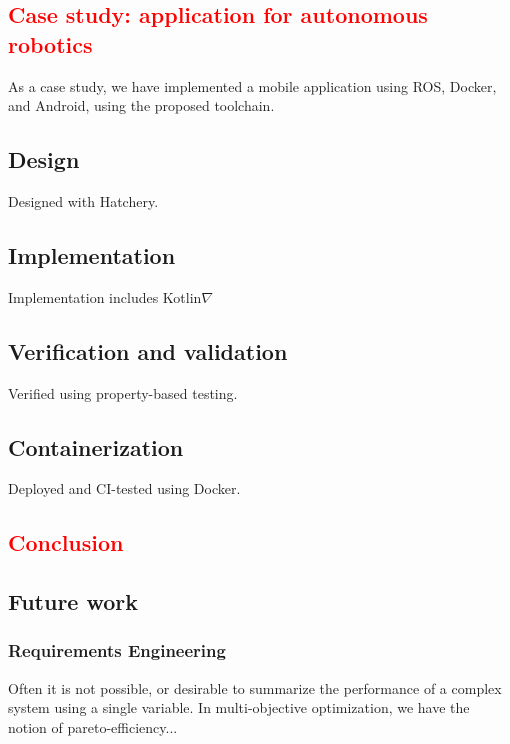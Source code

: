 \documentclass[12pt,initial,twoside,maitrise]{dms}
\newcommand{\rare}[1]{\textcolor{red}{#1}}
\numberwithin{equation}{section}
\numberwithin{table}{chapter}
\numberwithin{figure}{chapter}
\begin{document}
\rare{\chapter{Case study: application for autonomous robotics}\label{ch:case-study}}

As a case study, we have implemented a mobile application using ROS, Docker, and Android, using the proposed toolchain.

\section{Design}

Designed with Hatchery.

\section{Implementation}

Implementation includes Kotlin$\nabla$

\section{Verification and validation}

Verified using property-based testing.

\section{Containerization}

Deployed and CI-tested using Docker.

\rare{\chapter{Conclusion}\label{ch:conclusion}}

\section{Future work}

\subsection{Requirements Engineering}

Often it is not possible, or desirable to summarize the performance of a complex system using a single variable. In multi-objective optimization, we have the notion of pareto-efficiency...
\end{document}
